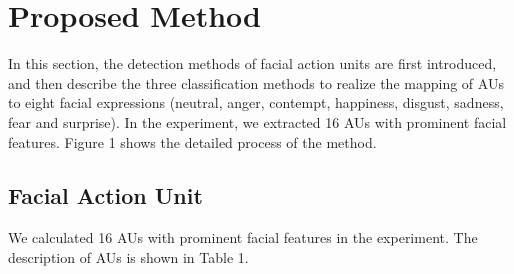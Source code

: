 \documentclass[10pt, conference, compsocconf]{IEEEtran}
\begin{document}
\section{Proposed Method}
In this section, the detection methods of facial action units are first introduced, and then describe the three classification methods to realize the mapping of AUs to eight facial expressions (neutral, anger, contempt, happiness, disgust, sadness, fear and surprise). In the experiment, we extracted 16 AUs with prominent facial features. Figure 1 shows the detailed process of the method.

\subsection{Facial Action Unit}

We calculated 16 AUs with prominent facial features in the experiment. The description of AUs is shown in Table 1.
\end{document}

